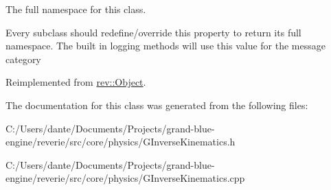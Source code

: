 The full namespace for this class. 

Every subclass should redefine/override this property to return its full namespace. The built in logging methods will use this value for the message category 

Reimplemented from \mbox{\hyperlink{classrev_1_1_object_aaeb638d3e10f361c56c211a318a27f3d}{rev\+::\+Object}}.



The documentation for this class was generated from the following files\+:\begin{DoxyCompactItemize}
\item 
C\+:/\+Users/dante/\+Documents/\+Projects/grand-\/blue-\/engine/reverie/src/core/physics/G\+Inverse\+Kinematics.\+h\item 
C\+:/\+Users/dante/\+Documents/\+Projects/grand-\/blue-\/engine/reverie/src/core/physics/G\+Inverse\+Kinematics.\+cpp\end{DoxyCompactItemize}
